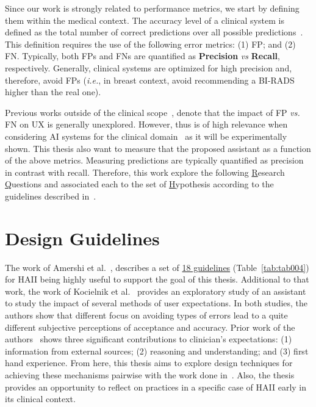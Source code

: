 \vspace{2.00mm}


Since our work is strongly related to performance metrics, we start by defining them within the medical context.
The accuracy level of a clinical system is defined as the total number of correct predictions over all possible predictions~\cite{seref2019performance}.
This definition requires  the use of the following error metrics:
(1) \ac{FP}; and
(2) \ac{FN}.
Typically, both \acp{FP} and \acp{FN} are quantified as {\bf Precision} {\it vs} {\bf Recall}, respectively.
Generally, clinical systems are optimized for high precision and, therefore, avoid \acp{FP} ({\it i.e.}, in breast context, avoid recommending a \ac{BI-RADS} higher than the real one).

Previous works outside of the clinical scope~\cite{Kocielnik:2019:YAI:3290605.3300641, Dove:2017:UDI:3025453.3025739}, denote that the impact of \ac{FP} {\it vs.} \ac{FN} on \ac{UX} is generally unexplored.
However, thus is of high relevance when considering \ac{AI} systems for the clinical domain~\cite{boughey2016identification, dialani2015role} as it will be experimentally shown.
This thesis also want to measure that the proposed assistant as a function of the above metrics.
Measuring predictions are typically quantified as precision in contrast with recall.
Therefore, this work explore the following \underline{R}esearch \underline{Q}uestions and associated each to the set of \underline{H}ypothesis according to the guidelines described in~\cite{10.1145/3290605.3300233, Kocielnik:2019:YAI:3290605.3300641}.

\section{Design Guidelines}
\label{sec:app002002}

The work of Amershi et al.~\cite{10.1145/3290605.3300233}, describes a set of \underline{18 guidelines} (Table~\ref{tab:tab004}) for \ac{HAII} being highly useful to support the goal of this thesis.
Additional to that work, the work of Kocielnik et al.~\cite{Kocielnik:2019:YAI:3290605.3300641} provides an exploratory study of an assistant to study the impact of several methods of user expectations.
In both studies, the authors show that different focus on avoiding types of errors lead to a quite different subjective perceptions of acceptance and accuracy.
Prior work of the authors~\cite{Kocielnik:2019:YAI:3290605.3300641} shows three significant contributions to clinician's expectations:
(1) information from external sources;
(2) reasoning and understanding; and
(3) first hand experience.
From here, this thesis aims to explore design techniques for achieving these mechanisms pairwise with the work done in~\cite{10.1145/3290605.3300233}.
Also, the thesis provides an opportunity to reflect on practices in a specific case of \ac{HAII} early in its clinical context.

